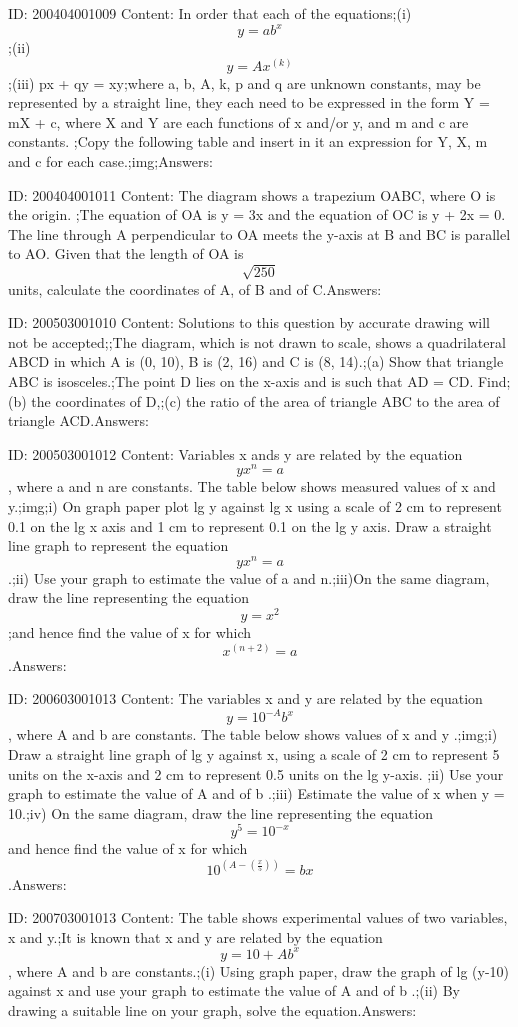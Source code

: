 \documentclass{article}
\begin{document}
ID: 200404001009
Content:
In order that each of the equations;(i) $$y=ab^x$$;(ii) $$y=Ax^{(k)}$$;(iii) px + qy = xy;where a, b, A, k, p and q are unknown constants, may be represented by a straight line, they each need to be expressed in the form Y = mX + c, where X and Y are each functions of x and/or y, and m and c are constants. ;Copy the following table and insert in it an expression for Y, X, m and c for each case.;img;Answers:

ID: 200404001011
Content:
The diagram shows a trapezium OABC, where O is the origin. ;The equation of OA is y = 3x and the equation of OC is y + 2x = 0. The line through A perpendicular to OA meets the y-axis at B and BC is parallel to AO. Given that the length of OA is $$\sqrt{250}$$ units, calculate the coordinates of A, of B and of C.Answers:

ID: 200503001010
Content:
Solutions to this question by accurate drawing will not be accepted;;The diagram, which is not drawn to scale, shows a quadrilateral ABCD in which A is (0, 10), B is (2, 16) and C is (8, 14).;(a) Show that triangle ABC is isosceles.;The point D lies on the x-axis and is such that AD = CD. Find;(b) the coordinates of D,;(c) the ratio of the area of triangle ABC to the area of triangle ACD.Answers:

ID: 200503001012
Content:
Variables x ands y are related by the equation $$yx^n=a$$, where a and n are constants. The table below shows measured values of x and y.;img;i)	On graph paper plot lg y against lg x using a scale of 2 cm to represent 0.1 on the lg x axis and 1 cm to represent 0.1 on the lg y axis. Draw a straight line graph to represent the equation $$yx^n=a$$.;ii)	Use your graph to estimate the value of a and n.;iii)On the same diagram, draw the line representing the equation $$y = x^2$$;and hence find the value of x for which $$x^{(n+2)}=a$$.Answers:

ID: 200603001013
Content:
The variables x and y are related by the equation $$y=10^{-A}b^x$$, where A and b are constants. The table below shows values of x and y .;img;i) Draw a straight line graph of lg y against x, using a scale of 2 cm to represent 5 units on the x-axis and 2 cm to represent 0.5 units on the lg y-axis. ;ii) Use your graph to estimate the value of A and of b .;iii) Estimate the value of x when y = 10.;iv) On the same diagram, draw the line representing the equation $$y^5=10^{-x}$$and hence find the value of x for which $$10^{(A-( \frac{x}{5}))}=bx$$.Answers:

ID: 200703001013
Content:
The table shows experimental values of two variables, x and y.;It is known that x and y are related by the equation $$y=10+Ab^x$$, where A and b are constants.;(i) Using graph paper, draw the graph of lg (y-10) against x and use your graph to estimate the value of A and of b .;(ii) By drawing a suitable line on your graph, solve the equation.Answers:
\end{document}
